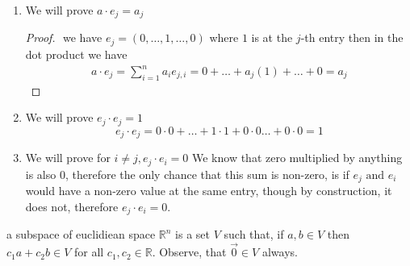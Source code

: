 \documentclass[11pt]{book}
\begin{document}
\begin{enumerate}
\begin{proof}
\begin{gather*}
        \sqrt{4\left( a \cdot b \right) ^2 }  - 4\left\Vert a \right\Vert ^2 \left\Vert b \right\Vert ^2 \le 0\\
        4\left( a \cdot b \right) ^2  - 4\left\Vert a \right\Vert ^2 \left\Vert b \right\Vert ^2 \le 0\\
        \left( a \cdot b \right) ^2 \le \left\Vert a \right\Vert ^2 \left\Vert b \right\Vert ^2 \\
        \left| a \cdot b \right| \le \left\Vert a \right\Vert \left\Vert b \right\Vert 
    \end{gather*}
    \end{proof}
    \item We will prove $a \cdot e_{j} = a_{j} $ 
        \begin{proof}
        $ $\newline
        we have $e_{j} = \left( 0, \ldots , 1, \ldots , 0 \right) $ where $1$ is at the $j$-th entry then in the dot product we have 
        \begin{align*}
            a \cdot e_{j} = \sum_{i=1}^{n} a_{i} e_{j,i} = 0  + \ldots  + a_{j} \left( 1 \right)  + \ldots  + 0=  a_{j} 
        \end{align*}
        \end{proof}
    \item We will prove $e_{j}  \cdot e_{j} = 1$ 
        \[
            e_{j}  \cdot e_{j} = 0  \cdot 0  +  \ldots   + 1 \cdot 1  + 0 \cdot 0 \ldots  + 0 \cdot 0 = 1
        \]
    \item We will prove for $i \neq j, e_{j}  \cdot e_{i} = 0$ 
        We know that zero multiplied by anything is also 0, therefore the only chance that this sum is non-zero, is if $e_{j} \text{ and } e_{i} $ would have a non-zero value at the same entry, though by construction, it does not, therefore $e_{j}  \cdot e_{i} = 0$.
\end{enumerate}



\begin{defn}[Subspace]\label{defn:subspace}
    a subspace of euclidiean space $\mathbb{R} ^{n} $ is a set $V$ such that, if $a, b \in V$ then $c_1a + c_2b \in V$ for all $c_1, c_2\in  \mathbb{R} $. Observe, that $\vec{0} \in V$ always. 
\end{defn}
\end{document}
